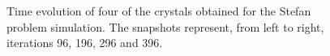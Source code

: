 \begin{figure}[ht!]
\begin{center}
{}
\caption{Time evolution of four of the crystals obtained for the Stefan problem simulation. The snapshots represent, from left to right, iterations 96, 196, 296 and 396.} \label{fig:stefan_evolution}
\end{center}
\end{figure}
